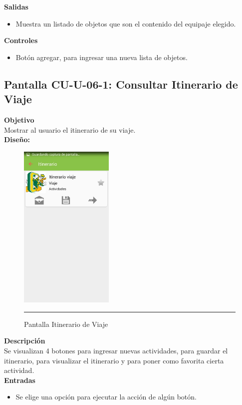 \textbf{Salidas}
\begin{itemize}
\item Muestra un listado de objetos que son el contenido del equipaje elegido.
\end{itemize}

\textbf{Controles}
\begin{itemize}
\item Botón agregar, para ingresar una nueva lista de objetos.
\end{itemize}
\clearpage
\hypertarget{CU-U-06-1}{}
\subsection{Pantalla CU-U-06-1: Consultar Itinerario de Viaje}
\textbf{Objetivo}\\
Mostrar al usuario el itinerario de su viaje. \\

\textbf{Diseño:}
\begin{figure}[h]
	\centering
		\includegraphics[width=0.4\textwidth]{Figuras/intItinerarioViaje.jpg}
		\rule{30em}{0.5pt}
	\caption[Pantalla Itinerario de Viaje]{Pantalla Itinerario de Viaje}
	\label{fig:intItinerarioViaje}
\end{figure}

\textbf{Descripción} \\
Se visualizan 4 botones para ingresar nuevas actividades, para guardar el itinerario, para visualizar el itinerario y para poner como favorita cierta actividad. \\

\textbf{Entradas}
\begin{itemize}
\item Se elige una opción para ejecutar la acción de algún botón.
\end{itemize}

